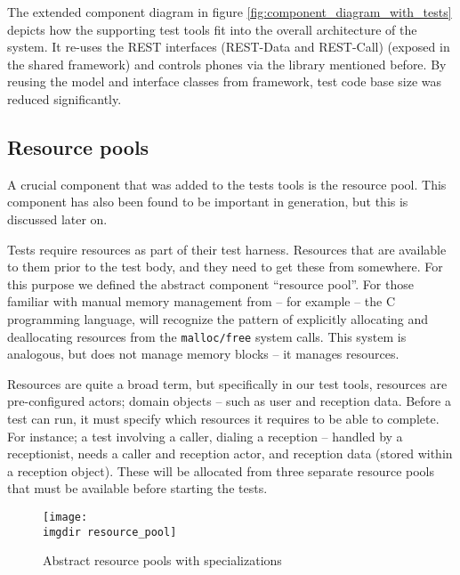 \noindent The extended component diagram in figure \ref{fig:component_diagram_with_tests} depicts how the supporting test tools fit into the overall architecture of the system. It re-uses the REST interfaces (REST-Data and REST-Call) (exposed in the shared framework) and controls phones via the library mentioned before. By reusing the model and interface classes from framework, test code base size was reduced significantly.
\subsection{Resource pools}
\label{ssec:resource-pools}
A crucial component that was added to the tests tools is the resource pool. This component has also been found to be important in generation, but this is discussed later on.\medskip

\noindent Tests require resources as part of their test harness. Resources that are available to them prior to the test body, and they need to get these from somewhere. For this purpose we defined the abstract component ``resource pool''. For those familiar with manual memory management from -- for example -- the C programming language, will recognize the pattern of explicitly allocating and deallocating resources from the \texttt{malloc/free} system calls. This system is analogous, but does not manage memory blocks -- it manages resources.\medskip

\noindent Resources are quite a broad term, but specifically in our test tools, resources are pre-configured actors; domain objects -- such as user and reception data. Before a test can run, it must specify which resources it requires to be able to complete. For instance; a test involving a caller, dialing a reception -- handled by a receptionist, needs a caller and reception actor, and reception data (stored within a reception object). These will be allocated from three separate resource pools that must be available before starting the tests.\medskip

\begin{figure}[!htbp]
\centering
\texttt{[image: \\imgdir resource\_pool]}
\caption{Abstract resource pools with specializations}
\label{fig:resource_pool}
\end{figure}

